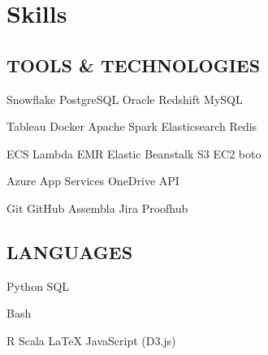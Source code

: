 \documentclass[]{deedy-resume-openfont}
\begin{document}
\section{Skills}
\begin{minipage}[t]{.5\textwidth}
\subsection{TOOLS \& TECHNOLOGIES}

\hspace*{4mm} Snowflake \textbullet{} PostgreSQL \textbullet{} Oracle \textbullet{} Redshift \textbullet{} MySQL

\hspace*{4mm} Tableau \textbullet{} Docker \textbullet{} Apache Spark \textbullet{} Elasticsearch \textbullet{} Redis%

\hspace*{4mm} ECS \textbullet{} Lambda \textbullet{} EMR \textbullet{} Elastic Beanstalk \textbullet{} S3 \textbullet{} EC2 \textbullet{} boto

\hspace*{4mm} Azure App Services \textbullet{} OneDrive API


\hspace*{4mm} Git \textbullet{} GitHub \textbullet{} Assembla \textbullet{} Jira \textbullet{} Proofhub

\end{minipage}
\hfill
\begin{minipage}[t]{.4\textwidth}
\subsection{LANGUAGES}

\hspace*{4mm} Python \textbullet{} SQL

\hspace*{4mm} Bash

\hspace*{4mm} R \textbullet{} Scala \textbullet{} \LaTeX \textbullet{} JavaScript (D3.js)

\end{minipage}





\sectionsep
\end{document}
